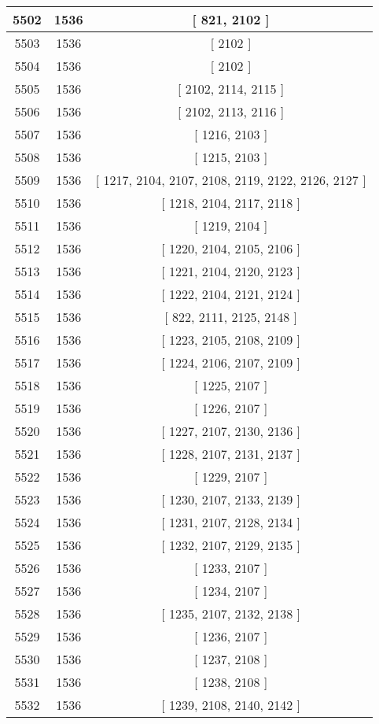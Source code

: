 \begin{center}
\begin{longtable}[H]{|| c c c ||}
\hline
5502 & 1536 & [ 821, 2102 ] \\ 
\hline
5503 & 1536 & [ 2102 ] \\ 
\hline
5504 & 1536 & [ 2102 ] \\ 
\hline
5505 & 1536 & [ 2102, 2114, 2115 ] \\ 
\hline
5506 & 1536 & [ 2102, 2113, 2116 ] \\ 
\hline
5507 & 1536 & [ 1216, 2103 ] \\ 
\hline
5508 & 1536 & [ 1215, 2103 ] \\ 
\hline
5509 & 1536 & [ 1217, 2104, 2107, 2108, 2119, 2122, 2126, 2127 ] \\ 
\hline
5510 & 1536 & [ 1218, 2104, 2117, 2118 ] \\ 
\hline
5511 & 1536 & [ 1219, 2104 ] \\ 
\hline
5512 & 1536 & [ 1220, 2104, 2105, 2106 ] \\ 
\hline
5513 & 1536 & [ 1221, 2104, 2120, 2123 ] \\ 
\hline
5514 & 1536 & [ 1222, 2104, 2121, 2124 ] \\ 
\hline
5515 & 1536 & [ 822, 2111, 2125, 2148 ] \\ 
\hline
5516 & 1536 & [ 1223, 2105, 2108, 2109 ] \\ 
\hline
5517 & 1536 & [ 1224, 2106, 2107, 2109 ] \\ 
\hline
5518 & 1536 & [ 1225, 2107 ] \\ 
\hline
5519 & 1536 & [ 1226, 2107 ] \\ 
\hline
5520 & 1536 & [ 1227, 2107, 2130, 2136 ] \\ 
\hline
5521 & 1536 & [ 1228, 2107, 2131, 2137 ] \\ 
\hline
5522 & 1536 & [ 1229, 2107 ] \\ 
\hline
5523 & 1536 & [ 1230, 2107, 2133, 2139 ] \\ 
\hline
5524 & 1536 & [ 1231, 2107, 2128, 2134 ] \\ 
\hline
5525 & 1536 & [ 1232, 2107, 2129, 2135 ] \\ 
\hline
5526 & 1536 & [ 1233, 2107 ] \\ 
\hline
5527 & 1536 & [ 1234, 2107 ] \\ 
\hline
5528 & 1536 & [ 1235, 2107, 2132, 2138 ] \\ 
\hline
5529 & 1536 & [ 1236, 2107 ] \\ 
\hline
5530 & 1536 & [ 1237, 2108 ] \\ 
\hline
5531 & 1536 & [ 1238, 2108 ] \\ 
\hline
5532 & 1536 & [ 1239, 2108, 2140, 2142 ] \\ 

\end{longtable}
\end{center}

